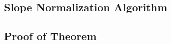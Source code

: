 \documentclass[]{article}
\begin{document}
\subsection{Slope Normalization Algorithm}
\newpage
\subsection{Proof of Theorem}

\begin{figure}[H]
\hspace{0.1in}
\raisebox{0.5in}{}
\end{figure}
\end{document}
